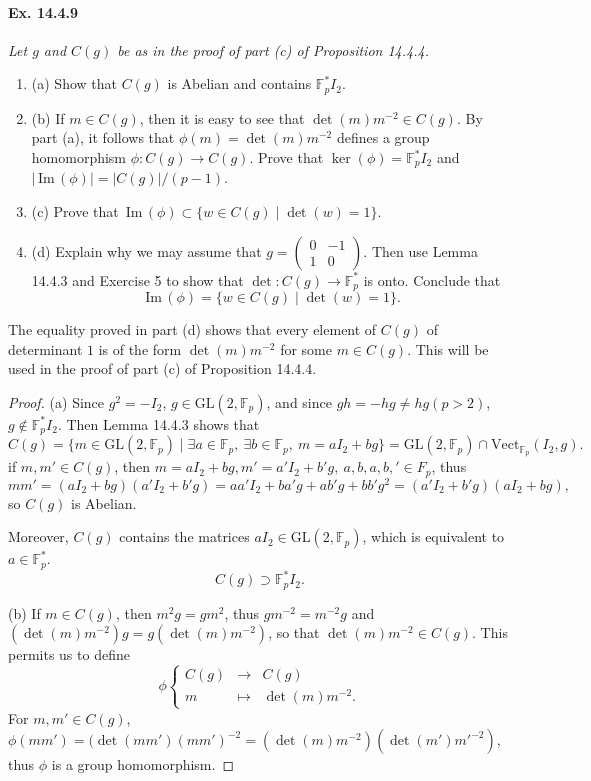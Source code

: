 \documentclass[11pt,a4paper]{article}
\newcommand{\be} {\begin{enumerate}}
\newcommand{\ee} {\end{enumerate}}
\newcommand{\F}{\mathbb{F}}
\newcommand{\im}{\,\mathrm{Im}\,}
\begin{document}
{\paragraph{Ex. 14.4.9}{\it Let $g$ and $C(g)$ be as in the proof of part (c) of Proposition 14.4.4.
\be
\item[(a)] Show that $C(g)$ is Abelian and contains $\F_p^* I_2$.
\item[(b)] If $m \in C(g)$, then it is easy to see that $\det(m) m^{-2} \in C(g)$. By part (a), it follows that $\phi(m) = \det(m) m^{-2}$ defines a group homomorphism $\phi : C(g) \to C(g)$. Prove that $\ker(\phi) = \F_p^* I_2$ and $|\im(\phi)| = |C(g)|/(p-1)$.
\item[(c)] Prove that $\im(\phi) \subset \{w \in C(g) \mid \det(w) = 1\}$.
\item[(d)] Explain why we may assume that $g = \begin{pmatrix} 0 & -1\\1 & 0 \end{pmatrix}$. Then use Lemma 14.4.3 and Exercise 5 to show that $\det:C(g) \to \F_p^*$ is onto. Conclude that
$$\im(\phi) = \{w \in C(g) \mid \det(w) = 1\}.$$
\ee
The equality proved in part (d) shows that every element of $C(g)$ of determinant $1$ is of the form $\det(m)m^{-2}$ for some $m\in C(g)$. This will be used in the proof of part (c) of Proposition 14.4.4.
}

\begin{proof}
\item[(a)] Since $g^2 = -I_2$, $g \in \mathrm{GL}(2,\F_p)$, and since $gh = -hg \ne hg (p>2)$, $g \not \in \F_p^* I_2$. Then Lemma 14.4.3 shows that
$$C(g) = \{m \in \mathrm{GL}(2,\F_p) \mid \exists a \in \F_p, \ \exists b \in \F_p, \ m = aI_2 + bg\} = \mathrm{GL}(2,\F_p) \cap \mathrm{Vect}_{\F_p}(I_2,g).$$
if $m, m' \in C(g)$, then $m = aI_2+bg, m' =a'I_2 + b'g,\ a,b,a,b,' \in F_p$, thus
$$mm' =  (aI_2+bg)( a'I_2+b'g) = aa'I_2 + ba'g + a b' g + bb'g^2 = ( a'I_2+b'g)( aI_2+bg),$$
so $C(g)$ is Abelian. 

Moreover, $C(g)$ contains the matrices $aI_2 \in \mathrm{GL}(2,\F_p)$, which is equivalent to $a \in \F_p^*$.
$$C(g)\supset \F_p^* I_2.$$

\item[(b)] If $m\in C(g)$, then $m^2 g = gm^2$, thus $gm^{-2} = m^{-2} g$ and $(\det(m) m^{-2}) g = g (\det(m) m^{-2})$, so that $\det(m) m^{-2} \in C(g)$. This permits us to define
$$
\phi
\left\{
\begin{array}{ccc}
C(g) & \to &C(g)\\
m & \mapsto &\det(m) m^{-2}.
\end{array}
\right.
$$
For $m,m' \in C(g)$, $\phi(mm') = (\det(mm') (mm')^{-2} = (\det(m)m^{-2})(\det(m') m'^{-2})$, thus $\phi$ is a group homomorphism.


\end{proof}}
\end{document}
